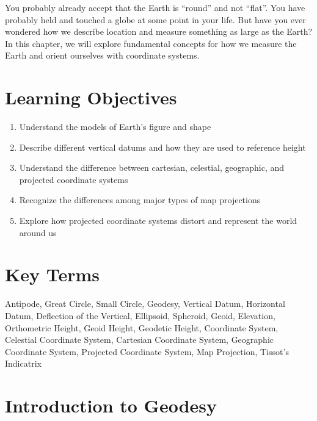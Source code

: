 \documentclass[
]{book}
\providecommand{\tightlist}{%
  \setlength{\itemsep}{0pt}\setlength{\parskip}{0pt}}
\begin{document}
You probably already accept that the Earth is ``round'' and not ``flat''. You have probably held and touched a globe at some point in your life. But have you ever wondered how we describe location and measure something as large as the Earth? In this chapter, we will explore fundamental concepts for how we measure the Earth and orient ourselves with coordinate systems.

\hypertarget{learning-objectives-1}{%
\section*{Learning Objectives}\label{learning-objectives-1}}

\begin{enumerate}
\def\labelenumi{\arabic{enumi}.}
\tightlist
\item
  Understand the models of Earth's figure and shape
\item
  Describe different vertical datums and how they are used to reference height
\item
  Understand the difference between cartesian, celestial, geographic, and projected coordinate systems
\item
  Recognize the differences among major types of map projections
\item
  Explore how projected coordinate systems distort and represent the world around us
\end{enumerate}

\hypertarget{key-terms-1}{%
\section*{Key Terms}\label{key-terms-1}}

Antipode, Great Circle, Small Circle, Geodesy, Vertical Datum, Horizontal Datum, Deflection of the Vertical, Ellipsoid, Spheroid, Geoid, Elevation, Orthometric Height, Geoid Height, Geodetic Height, Coordinate System, Celestial Coordinate System, Cartesian Coordinate System, Geographic Coordinate System, Projected Coordinate System, Map Projection, Tissot's Indicatrix

\hypertarget{introduction-to-geodesy}{%
\section{Introduction to Geodesy}\label{introduction-to-geodesy}}
\end{document}
